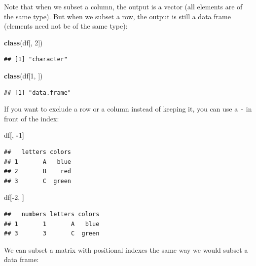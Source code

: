 \documentclass[
]{book}
\newenvironment{Shaded}{\begin{snugshade}}{\end{snugshade}}
\newcommand{\DecValTok}[1]{\textcolor[rgb]{0.00,0.00,0.81}{#1}}
\newcommand{\FunctionTok}[1]{\textcolor[rgb]{0.13,0.29,0.53}{\textbf{#1}}}
\newcommand{\NormalTok}[1]{#1}
\newcommand{\SpecialCharTok}[1]{\textcolor[rgb]{0.81,0.36,0.00}{\textbf{#1}}}
\begin{document}
Note that when we subset a column, the output is a vector (all elements are of
the same type). But when we subset a row, the output is still a data frame
(elements need not be of the same type):

\begin{Shaded}
\begin{Highlighting}[]
\FunctionTok{class}\NormalTok{(df[, }\DecValTok{2}\NormalTok{])}
\end{Highlighting}
\end{Shaded}

\begin{verbatim}
## [1] "character"
\end{verbatim}

\begin{Shaded}
\begin{Highlighting}[]
\FunctionTok{class}\NormalTok{(df[}\DecValTok{1}\NormalTok{, ])}
\end{Highlighting}
\end{Shaded}

\begin{verbatim}
## [1] "data.frame"
\end{verbatim}

If you want to exclude a row or a column instead of keeping it, you can use a \texttt{-}
in front of the index:

\begin{Shaded}
\begin{Highlighting}[]
\NormalTok{df[, }\SpecialCharTok{{-}}\DecValTok{1}\NormalTok{]}
\end{Highlighting}
\end{Shaded}

\begin{verbatim}
##   letters colors
## 1       A   blue
## 2       B    red
## 3       C  green
\end{verbatim}

\begin{Shaded}
\begin{Highlighting}[]
\NormalTok{df[}\SpecialCharTok{{-}}\DecValTok{2}\NormalTok{, ]}
\end{Highlighting}
\end{Shaded}

\begin{verbatim}
##   numbers letters colors
## 1       1       A   blue
## 3       3       C  green
\end{verbatim}

We can subset a matrix with positional indexes the same way we would subset a
data frame:
\end{document}
